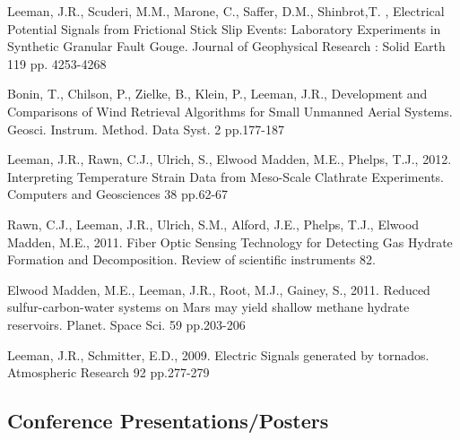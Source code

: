 \documentclass[letterpaper]{article}
\renewenvironment{itemize}{
  \begin{list}{}{
    \setlength{\leftmargin}{1.5em}
  }
}{
  \end{list}
}
\begin{document}
\begin{itemize}

\item Leeman, J.R., Scuderi, M.M., Marone, C., Saffer, D.M., Shinbrot,T. , Electrical Potential Signals from Frictional Stick Slip Events: Laboratory Experiments  in Synthetic Granular Fault Gouge. Journal of Geophysical Research : Solid Earth 119 pp. 4253-4268

\item Bonin, T., Chilson, P., Zielke, B., Klein, P., Leeman, J.R., Development and Comparisons of Wind Retrieval Algorithms for Small Unmanned Aerial Systems. Geosci. Instrum. Method. Data Syst. 2 pp.177-187

\item Leeman, J.R., Rawn, C.J., Ulrich, S., Elwood Madden, M.E., Phelps, T.J., 2012.  Interpreting Temperature Strain Data from Meso-Scale Clathrate Experiments. Computers and Geosciences 38 pp.62-67

\item Rawn, C.J., Leeman, J.R., Ulrich, S.M., Alford, J.E., Phelps, T.J., Elwood Madden, M.E., 2011. Fiber Optic Sensing Technology for Detecting Gas Hydrate Formation and Decomposition. Review of scientific instruments 82.

\item Elwood Madden, M.E., Leeman, J.R., Root, M.J., Gainey, S., 2011. Reduced sulfur-carbon-water systems on Mars may yield shallow methane hydrate reservoirs. Planet. Space Sci. 59 pp.203-206

\item Leeman, J.R., Schmitter, E.D., 2009. Electric Signals generated by tornados. Atmospheric Research 92 pp.277-279

\end{itemize}

\subsection*{Conference Presentations/Posters}
\end{document}
